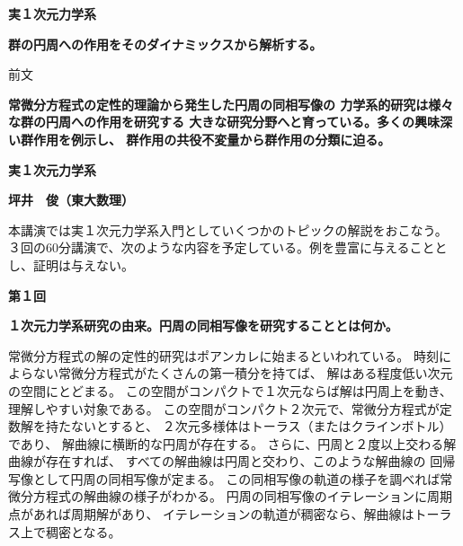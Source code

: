 \documentclass[uplatex,dvipdfmx]{jlreq}
\begin{document}
\begin{center}
  \vspace*{20pt}
  {\Huge\bfseries 実１次元力学系}

  \vspace{30pt}

  {\Large\bfseries 群の円周への作用をそのダイナミックスから解析する。}

  \vspace{50pt}

  {\large 前文}

  \vspace{10pt}

  \parbox{0.85\textwidth}{
    \large\bfseries
    常微分方程式の定性的理論から発生した円周の同相写像の
    力学系的研究は様々な群の円周への作用を研究する
    大きな研究分野へと育っている。多くの興味深い群作用を例示し、
    群作用の共役不変量から群作用の分類に迫る。
  }
\end{center}

\vfill


\newpage

\begin{center}
  {\large\bfseries 実１次元力学系}
\end{center}
\begin{flushright}
  \textbf{坪井　俊（東大数理）}
\end{flushright}

\smallskip

本講演では実１次元力学系入門としていくつかのトピックの解説をおこなう。
３回の60分講演で、次のような内容を予定している。例を豊富に与えることとし、証明は与えない。

\bigskip
\noindent
{\large\textbf{第１回}}

\medskip
\noindent
\textbf{１次元力学系研究の由来。円周の同相写像を研究することとは何か。}

\medskip

常微分方程式の解の定性的研究はポアンカレに始まるといわれている。
時刻によらない常微分方程式がたくさんの第一積分を持てば、
解はある程度低い次元の空間にとどまる。
この空間がコンパクトで１次元ならば解は円周上を動き、理解しやすい対象である。
この空間がコンパクト２次元で、常微分方程式が定数解を持たないとすると、
２次元多様体はトーラス（またはクラインボトル）であり、
解曲線に横断的な円周が存在する。
さらに、円周と２度以上交わる解曲線が存在すれば、
すべての解曲線は円周と交わり、このような解曲線の
回帰写像として円周の同相写像が定まる。
この同相写像の軌道の様子を調べれば常微分方程式の解曲線の様子がわかる。
円周の同相写像のイテレーションに周期点があれば周期解があり、
イテレーションの軌道が稠密なら、解曲線はトーラス上で稠密となる。
\end{document}
